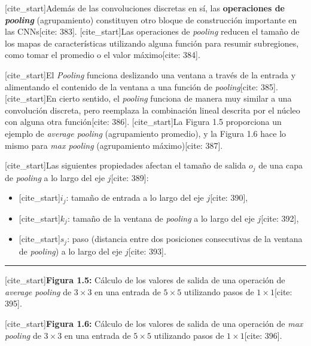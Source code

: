 \documentclass[
  super,
  preprint,
  3p]{elsarticle}
\providecommand{\tightlist}{%
  \setlength{\itemsep}{0pt}\setlength{\parskip}{0pt}}\usepackage{longtable,booktabs,array}
\begin{document}
{[}cite\_start{]}Además de las convoluciones discretas en sí, las
\textbf{operaciones de \emph{pooling}} (agrupamiento) constituyen otro
bloque de construcción importante en las CNNs{[}cite: 383{]}.
{[}cite\_start{]}Las operaciones de \emph{pooling} reducen el tamaño de
los mapas de características utilizando alguna función para resumir
subregiones, como tomar el promedio o el valor máximo{[}cite: 384{]}.

{[}cite\_start{]}El \emph{Pooling} funciona deslizando una ventana a
través de la entrada y alimentando el contenido de la ventana a una
función de \emph{pooling}{[}cite: 385{]}. {[}cite\_start{]}En cierto
sentido, el \emph{pooling} funciona de manera muy similar a una
convolución discreta, pero reemplaza la combinación lineal descrita por
el núcleo con alguna otra función{[}cite: 386{]}. {[}cite\_start{]}La
Figura 1.5 proporciona un ejemplo de \emph{average pooling}
(agrupamiento promedio), y la Figura 1.6 hace lo mismo para \emph{max
pooling} (agrupamiento máximo){[}cite: 387{]}.

{[}cite\_start{]}Las siguientes propiedades afectan el tamaño de salida
\(o_j\) de una capa de \emph{pooling} a lo largo del eje \(j\){[}cite:
389{]}:

\begin{itemize}
\tightlist
\item
  {[}cite\_start{]}\(i_j\): tamaño de entrada a lo largo del eje
  \(j\){[}cite: 390{]},
\item
  {[}cite\_start{]}\(k_j\): tamaño de la ventana de \emph{pooling} a lo
  largo del eje \(j\){[}cite: 392{]},
\item
  {[}cite\_start{]}\(s_j\): paso (distancia entre dos posiciones
  consecutivas de la ventana de \emph{pooling}) a lo largo del eje
  \(j\){[}cite: 393{]}.
\end{itemize}

\begin{center}\rule{0.5\linewidth}{0.5pt}\end{center}

{[}cite\_start{]}\textbf{Figura 1.5:} Cálculo de los valores de salida
de una operación de \emph{average pooling} de \(3 \times 3\) en una
entrada de \(5 \times 5\) utilizando pasos de \(1 \times 1\){[}cite:
395{]}.

{[}cite\_start{]}\textbf{Figura 1.6:} Cálculo de los valores de salida
de una operación de \emph{max pooling} de \(3 \times 3\) en una entrada
de \(5 \times 5\) utilizando pasos de \(1 \times 1\){[}cite: 396{]}.
\end{document}
